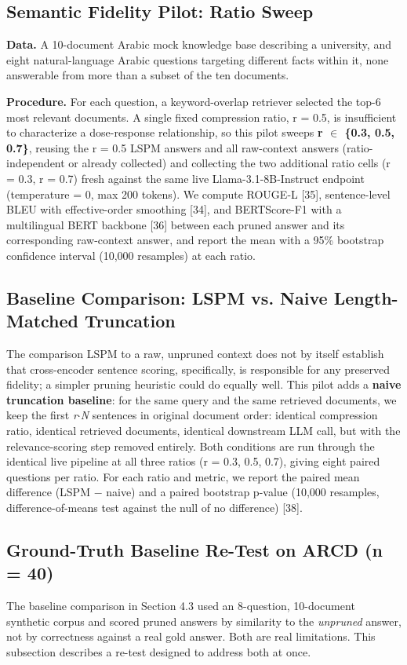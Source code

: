 \documentclass[pdflatex,sn-basic,Numbered]{sn-jnl}
\begin{document}
\subsection{Semantic Fidelity Pilot: Ratio Sweep}
\textbf{Data.} A 10-document Arabic mock knowledge base describing a university, and eight natural-language Arabic questions targeting different facts within it, none answerable from more than a subset of the ten documents.

\textbf{Procedure.} For each question, a keyword-overlap retriever selected the top-6 most relevant documents. A single fixed compression ratio, r = 0.5, is insufficient to characterize a dose-response relationship, so this pilot sweeps \textbf{r $\in$ \{0.3, 0.5, 0.7\}}, reusing the r = 0.5 LSPM answers and all raw-context answers (ratio-independent or already collected) and collecting the two additional ratio cells (r = 0.3, r = 0.7) fresh against the same live Llama-3.1-8B-Instruct endpoint (temperature = 0, max 200 tokens). We compute ROUGE-L [35], sentence-level BLEU with effective-order smoothing [34], and BERTScore-F1 with a multilingual BERT backbone [36] between each pruned answer and its corresponding raw-context answer, and report the mean with a 95\% bootstrap confidence interval (10,000 resamples) at each ratio.

\subsection{Baseline Comparison: LSPM vs. Naive Length-Matched Truncation}
The comparison LSPM to a raw, unpruned context does not by itself establish that cross-encoder sentence scoring, specifically, is responsible for any preserved fidelity; a simpler pruning heuristic could do equally well. This pilot adds a \textbf{naive truncation baseline}: for the same query and the same retrieved documents, we keep the first \textit{r}$\cdot$\textit{N} sentences in original document order: identical compression ratio, identical retrieved documents, identical downstream LLM call, but with the relevance-scoring step removed entirely. Both conditions are run through the identical live pipeline at all three ratios (r = 0.3, 0.5, 0.7), giving eight paired questions per ratio. For each ratio and metric, we report the paired mean difference (LSPM $-$ naive) and a paired bootstrap p-value (10,000 resamples, difference-of-means test against the null of no difference) [38].

\subsection{Ground-Truth Baseline Re-Test on ARCD (n = 40)}
The baseline comparison in Section 4.3 used an 8-question, 10-document synthetic corpus and scored pruned answers by similarity to the \textit{unpruned} answer, not by correctness against a real gold answer. Both are real limitations. This subsection describes a re-test designed to address both at once.
\end{document}
